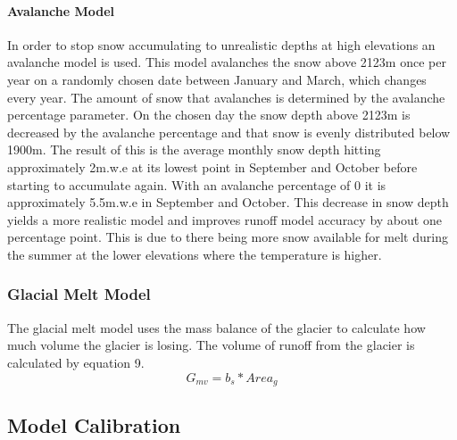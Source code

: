 \documentclass{article}
\begin{document}
\paragraph{Avalanche Model}
In order to stop snow accumulating to unrealistic depths at high elevations an avalanche model is used. This model avalanches the 
snow above 2123m once per year on a randomly chosen date between January and March, which changes every year. The amount of snow that 
avalanches is determined by the avalanche percentage parameter. On the chosen day the snow depth above 2123m is decreased by the avalanche 
percentage and that snow is evenly distributed below 1900m. The result of this is the average monthly snow depth hitting approximately 2m.w.e at its lowest point 
in September and October before starting to accumulate again. With an avalanche percentage of 0 it is approximately 5.5m.w.e 
in September and October. This decrease in snow depth yields a more realistic model and improves runoff model accuracy by about 
one percentage point. This is due to there being more snow available for melt during the summer at the lower elevations where the 
temperature is higher.

\subsubsection{Glacial Melt Model}
The glacial melt model uses the mass balance of the glacier to calculate how much volume the glacier is losing. The volume of runoff from the 
glacier is calculated by equation 9.
\begin{equation}G_{mv}=b_s*{Area}_{g}\label{tab:glacier_melt_eq}\end{equation}
\subsection{Model Calibration}
\end{document}
